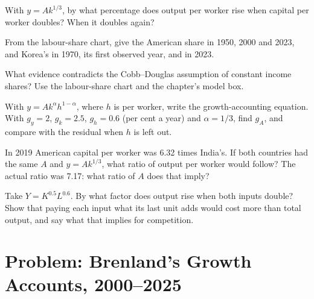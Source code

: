 \begin{exercise}[$\star\star$]\label{exo:g12:growth-and-production-function:10}
With $y = Ak^{1/3}$, by what percentage does output per worker rise when capital per worker doubles? When it doubles again?
\end{exercise}

\begin{exercise}[$\star\star$]\label{exo:g12:growth-and-production-function:11}
From the labour-share chart, give the American share in 1950, 2000 and 2023, and Korea's in 1970, its first observed year, and in 2023.
\end{exercise}

\begin{exercise}[$\star\star\star$]\label{exo:g12:growth-and-production-function:12}
What evidence contradicts the Cobb--Douglas assumption of constant income shares? Use the labour-share chart and the chapter's model box.
\end{exercise}

\begin{exercise}[$\star\star\star$]\label{exo:g12:growth-and-production-function:13}
With $y = Ak^{\alpha}h^{1 - \alpha}$, where $h$ is  per worker, write the growth-accounting equation. With $g_y = 2$, $g_k = 2.5$, $g_h = 0.6$ (per cent a year) and
$\alpha = 1/3$, find $g_A$, and compare with the residual when $h$ is left out.
\end{exercise}

\begin{exercise}[$\star\star\star$]\label{exo:g12:growth-and-production-function:14}
In 2019 American capital per worker was 6.32 times India's. If both countries had the same $A$ and $y = Ak^{1/3}$, what ratio of output per worker would follow? The actual
ratio was 7.17: what ratio of $A$ does that imply?
\end{exercise}

\begin{exercise}[$\star\star\star$]\label{exo:g12:growth-and-production-function:15}
Take $Y = K^{0.5}L^{0.6}$. By what factor does output rise when both inputs double? Show that paying each input what its last unit adds would cost more than total output,
and say what that implies for competition.
\end{exercise}

\section{Problem: Brenland's Growth Accounts, 2000--2025}

